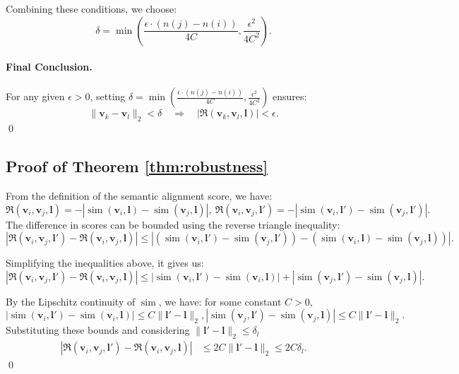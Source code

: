 Combining these conditions, we choose:
\[
\delta = \min\left( \frac{\epsilon \cdot (n(j) - n(i))}{4C}, \frac{\epsilon^2}{4C^2} \right).
\]

\paragraph{Final Conclusion.}
For any given \( \epsilon > 0 \), setting \( \delta = \min\left( \frac{\epsilon \cdot (n(j) - n(i))}{4C}, \frac{\epsilon^2}{4C^2} \right) \) ensures:
\[
\|\mathbf{v}_k - \mathbf{v}_l\|_2 < \delta \quad \Rightarrow \quad \left|\mathfrak{R}(\mathbf{v}_k, \mathbf{v}_l, \mathbf{l})\right| < \epsilon.
\]
\qed

\subsection{Proof of Theorem \ref{thm:robustness}}\label{sec:proof_robustness}
From the definition of the semantic alignment score, we have:
\[
\mathfrak{R}(\mathbf{v}_i, \mathbf{v}_j, \mathbf{l}) = -|\operatorname{sim}(\mathbf{v}_i, \mathbf{l}) - \operatorname{sim}(\mathbf{v}_j, \mathbf{l})|,~ \mathfrak{R}(\mathbf{v}_i, \mathbf{v}_j, \mathbf{l}') = -|\operatorname{sim}(\mathbf{v}_i, \mathbf{l}') - \operatorname{sim}(\mathbf{v}_j, \mathbf{l}')|.
\]
The difference in scores can be bounded using the reverse triangle inequality:
\[
|\mathfrak{R}(\mathbf{v}_i, \mathbf{v}_j, \mathbf{l}') - \mathfrak{R}(\mathbf{v}_i, \mathbf{v}_j, \mathbf{l})| \leq |(\operatorname{sim}(\mathbf{v}_i, \mathbf{l}') - \operatorname{sim}(\mathbf{v}_j, \mathbf{l}')) - (\operatorname{sim}(\mathbf{v}_i, \mathbf{l}) - \operatorname{sim}(\mathbf{v}_j, \mathbf{l})) |.
\]

Simplifying the inequalities above, it gives us:
\[
|\mathfrak{R}(\mathbf{v}_i, \mathbf{v}_j, \mathbf{l}') - \mathfrak{R}(\mathbf{v}_i, \mathbf{v}_j, \mathbf{l})| \leq |\operatorname{sim}(\mathbf{v}_i, \mathbf{l}') - \operatorname{sim}(\mathbf{v}_i, \mathbf{l})| + |\operatorname{sim}(\mathbf{v}_j, \mathbf{l}') - \operatorname{sim}(\mathbf{v}_j, \mathbf{l})|.
\]

By the Lipschitz continuity of \( \operatorname{sim} \), we have: for some constant $C>0$,
\[
|\operatorname{sim}(\mathbf{v}_i, \mathbf{l}') - \operatorname{sim}(\mathbf{v}_i, \mathbf{l})| \leq C \|\mathbf{l}' - \mathbf{l}\|_2, |\operatorname{sim}(\mathbf{v}_j, \mathbf{l}') - \operatorname{sim}(\mathbf{v}_j, \mathbf{l})| \leq C \|\mathbf{l}' - \mathbf{l}\|_2.
\]
Substituting these bounds and considering \( \|\mathbf{l}' - \mathbf{l}\|_2 \leq \delta_l \)
\begin{equation}
    \begin{split}
|\mathfrak{R}(\mathbf{v}_i, \mathbf{v}_j, \mathbf{l}') - \mathfrak{R}(\mathbf{v}_i, \mathbf{v}_j, \mathbf{l})| &\leq 2C \|\mathbf{l}' - \mathbf{l}\|_2 \leq 2C \delta_l.
\end{split}
\end{equation}
\qed



